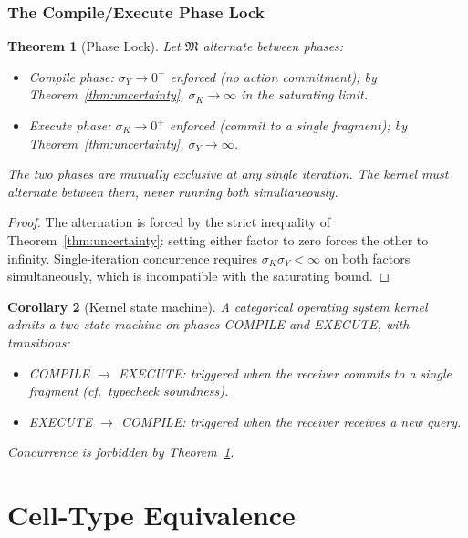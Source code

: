 \documentclass[11pt,a4paper]{article}
\newtheorem{theorem}{Theorem}[section]
\newtheorem{corollary}[theorem]{Corollary}
\newcommand{\Method}{\mathfrak{M}}
\newcommand{\disp}{\sigma}
\begin{document}
\section{The Compile/Execute Phase Lock}

\begin{theorem}[Phase Lock]
\label{thm:phase-lock}
Let $\Method$ alternate between phases:
\begin{itemize}[nosep, leftmargin=*]
\item \emph{Compile phase}: $\disp_Y \to 0^{+}$ enforced (no action commitment); by Theorem~\ref{thm:uncertainty}, $\disp_K \to \infty$ in the saturating limit.
\item \emph{Execute phase}: $\disp_K \to 0^{+}$ enforced (commit to a single fragment); by Theorem~\ref{thm:uncertainty}, $\disp_Y \to \infty$.
\end{itemize}
The two phases are mutually exclusive at any single iteration. The kernel must alternate between them, never running both simultaneously.
\end{theorem}

\begin{proof}
The alternation is forced by the strict inequality of Theorem~\ref{thm:uncertainty}: setting either factor to zero forces the other to infinity. Single-iteration concurrence requires $\disp_K \disp_Y < \infty$ on both factors simultaneously, which is incompatible with the saturating bound.
\end{proof}

\begin{corollary}[Kernel state machine]
\label{cor:kernel-state-machine}
A categorical operating system kernel admits a two-state machine on phases COMPILE and EXECUTE, with transitions:
\begin{itemize}[nosep, leftmargin=*]
\item COMPILE $\to$ EXECUTE: triggered when the receiver commits to a single fragment (cf.\ typecheck soundness).
\item EXECUTE $\to$ COMPILE: triggered when the receiver receives a new query.
\end{itemize}
Concurrence is forbidden by Theorem~\ref{thm:phase-lock}.
\end{corollary}

\part{Cell-Type Equivalence}
\end{document}
